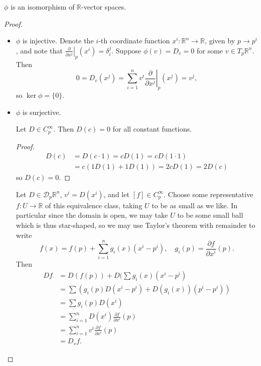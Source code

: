 \begin{theorem}
$\phi$ is an isomorphism of $\mathbb{R}$-vector spaces.
\end{theorem}

\begin{proof}

\begin{itemize}
  \item{
    $\phi$ is injective.
    Denote the $i$-th coordinate function
    $x^i : \mathbb{R}^n \to \mathbb{R}$, given by $p \to p^i$, and note
    that
    $\left.\frac{\partial}{\partial x^j}\right|_p (x^i) = \delta_i^j$.
    Suppose $\phi(v) = D_v = 0$ for some $v \in T_p \mathbb{R}^n$. Then
    $$
      0
    = D_v (x^j)
    = \sum_{i=1}^n
        v^i
        \left.
          \frac{\partial}
               {\partial x^j}
        \right|_p
          (x^j)
    = v^j,
    $$
    so $\ker \phi = \{ 0 \}$.
  }
  \item{
    $\phi$ is surjective.

    \begin{lemma}
      Let $D \in C_p^\infty$. Then $D(c) = 0$ for all constant
      functions.
    \end{lemma}
    \begin{proof}
      \begin{align*}
           D(c)
        &= D(c \cdot 1)
         = c D(1)
         = c D(1 \cdot 1) \\
        &= c (1 D(1) + 1 D(1))
         = 2 c D(1)
         = 2 D(c)
      \end{align*}
      so $D(c) = 0$.
    \end{proof}

    Let $D \in \mathcal{D}_p \mathbb{R}^n$, $v^i = D(x^i)$, and let
    $[f] \in C_p^\infty$. Choose some representative
    $f : U \to \mathbb{R}$ of this equivalence class, taking $U$ to be
    as small as we like. In particular since the domain is open, we
    may take $U$ to be some small ball which is thus star-shaped, so
    we may use Taylor's theorem with remainder to write
    $$
      f(x)
    = f(p)
    + \sum_{i=1}^n
        g_i(x)
        (x^i - p^i), \quad
      g_i(p)
    = \frac{\partial f}{\partial x^i}(p).
    $$
    Then
    \begin{align*}
       D f
    &= D(f(p))
     + D(\sum g_i (x) (x^i - p^i) \\
    &= \sum
         \left(
           g_i(p) D(x^i - p^i)
         + D(g_i(x))(p^i - p^i)
         \right) \\
    &= \sum
         g_i(p) D(x^i) \\
    &= \sum_{i=1}^n
         D(x^i)
         \frac{\partial f}
              {\partial x^i}(p) \\
    &= \sum_{i=1}^n
         v^i
         \frac{\partial f}
              {\partial x^i}(p) \\
    &= D_v f.
    \end{align*}
  }
\end{itemize}
\end{proof}
